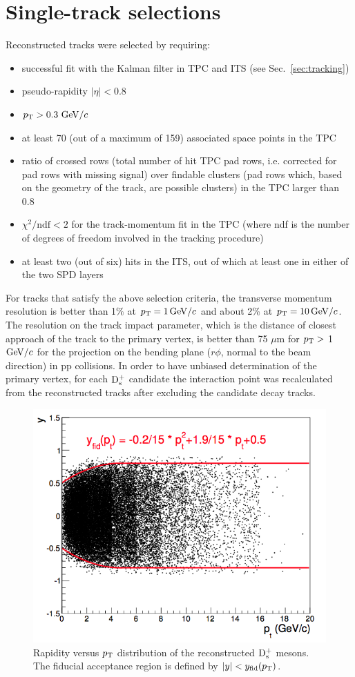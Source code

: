 \section{Single-track selections}
\label{sec:singleTrCuts}
Reconstructed tracks were selected by requiring:
\begin{itemize}
\item successful fit with the Kalman filter in TPC and ITS (see Sec.~\ref{sec:tracking})
\item pseudo-rapidity $|\eta| < 0.8$
\item $p_{\rm T} > 0.3~\mathrm{GeV}/c$
\item at least 70 (out of a maximum of 159)
associated space points in the TPC
\item ratio of crossed rows (total number of hit TPC pad rows, i.e. corrected 
for pad rows with missing signal) over findable clusters (pad rows which, 
based on the geometry of the track, are possible clusters) in the TPC larger than 0.8
\item $\chi^2/\mathrm{ndf} < 2$ for the track-momentum fit in the TPC (where ndf is the number of degrees of 
freedom involved in the tracking procedure)
\item at least two (out of six) hits in the ITS, out of which at least one 
in either of the two SPD layers
\end{itemize}
For tracks that satisfy the above selection criteria, the transverse momentum 
resolution is better than 1$\%$ at $p_{\rm T} = 1\, \mathrm{GeV}/c$ and about 2\% at $p_{\rm T} = 10 \, \mathrm{GeV}/c$. 
The resolution on the track impact parameter, which is the distance of closest 
approach of the track to the primary vertex, is better than 75 $\mu$m for 
$p_{\rm T} >$ 1 $\mathrm{GeV}/c$ for the projection on the bending plane ($r\phi$, normal to 
the beam direction) in pp collisions.
In order to have unbiased determination of the primary vertex, for each 
${\rm D_s^+}$ candidate the interaction point was recalculated from the reconstructed 
tracks after excluding the candidate decay tracks.
\begin{figure}[!h]
\centering
\includegraphics[width=.5\textwidth]{FigCap4/YvsPt.png}
\caption{Rapidity versus $p_{\rm T}$ distribution of the reconstructed ${\rm D_s^+}$ mesons. The fiducial acceptance region is defined by $|y| < y_{\rm fid}(p_{\rm T})$.}
\label{fig:yFiducial}
\end{figure}

